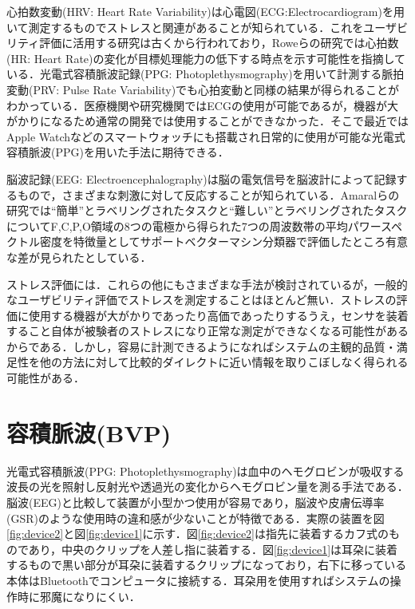 心拍数変動(HRV: Heart Rate Variability)は心電図(ECG:Electrocardiogram)を用いて測定するものでストレスと関連があることが知られている．これをユーザビリティ評価に活用する研究は古くから行われており，Roweらの研究では心拍数(HR: Heart Rate)の変化が目標処理能力の低下する時点を示す可能性を指摘している\cite{hrv1998}．光電式容積脈波記録(PPG: Photoplethysmography)を用いて計測する脈拍変動(PRV: Pulse Rate Variability)でも心拍変動と同様の結果が得られることがわかっている\cite{ppg}．医療機関や研究機関ではECGの使用が可能であるが，機器が大がかりになるため通常の開発では使用することができなかった．そこで最近ではApple Watchなどのスマートウォッチにも搭載され日常的に使用が可能な光電式容積脈波(PPG)を用いた手法に期待できる．

脳波記録(EEG: Electroencephalography)は脳の電気信号を脳波計によって記録するもので，さまざまな刺激に対して反応することが知られている．Amaralらの研究では``簡単''とラベリングされたタスクと``難しい''とラベリングされたタスクについてF,C,P,O領域の8つの電極から得られた7つの周波数帯の平均パワースペクトル密度を特徴量としてサポートベクターマシン分類器で評価したところ有意な差が見られたとしている\cite{eeg}．

ストレス評価には．これらの他にもさまざまな手法が検討されているが，一般的なユーザビリティ評価でストレスを測定することはほとんど無い．ストレスの評価に使用する機器が大がかりであったり高価であったりするうえ，センサを装着すること自体が被験者のストレスになり正常な測定ができなくなる可能性があるからである\cite{tullis2014}．しかし，容易に計測できるようになればシステムの主観的品質・満足性を他の方法に対して比較的ダイレクトに近い情報を取りこぼしなく得られる可能性がある．

\section{容積脈波(BVP)}

光電式容積脈波(PPG: Photoplethysmography)は血中のヘモグロビンが吸収する波長の光を照射し反射光や透過光の変化からヘモグロビン量を測る手法である\cite{pulseoximeter}．脳波(EEG)と比較して装置が小型かつ使用が容易であり，脳波や皮膚伝導率(GSR)のような使用時の違和感が少ないことが特徴である．実際の装置を図\ref{fig:device2}と図\ref{fig:device1}に示す．図\ref{fig:device2}は指先に装着するカフ式のものであり，中央のクリップを人差し指に装着する．図\ref{fig:device1}は耳朶に装着するもので黒い部分が耳朶に装着するクリップになっており，右下に移っている本体はBluetoothでコンピュータに接続する．耳朶用を使用すればシステムの操作時に邪魔になりにくい．

